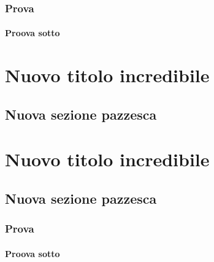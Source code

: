 \documentclass[a4paper, 11pt, openright, twoside]{report}
\begin{document}
\subsection[Prova]{Prova}
\label{chap:Prova}

\subsubsection[Proova sotto]{Proova sotto}
\label{chap:Proova sotto}


\chapter[Nuovo titolo incredibile]{Nuovo titolo incredibile}
\label{chap:Nuovo titolo incredibile}

\lipsum[1]

\section[Nuova sezione pazzesca]{Nuova sezione pazzesca}
\label{chap:Nuova sezione pazzesca}

\lipsum[1-2]


\chapter[Nuovo titolo incredibile]{Nuovo titolo incredibile}
\label{chap:Nuovo titolo incredibile}

\lipsum[1]

\section[Nuova sezione pazzesca]{Nuova sezione pazzesca}
\label{chap:Nuova sezione pazzesca}

\subsection[Prova]{Prova}
\label{chap:Prova}

\subsubsection[Proova sotto]{Proova sotto}
\label{chap:Proova sotto}
\end{document}

